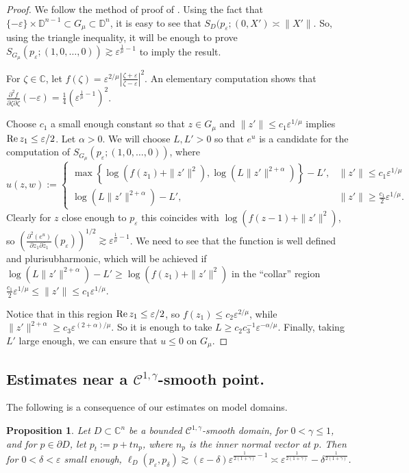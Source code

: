 \documentclass[a4paper,12pt]{amsart}
\def\D{\mathbb D}
\def\C{\mathbb C}
\def\bcases{\begin{cases}}
\newcommand{\br}[1]{\left(#1\right)}
\def\ecases{\end{cases}}
\newcommand{\set}[1]{\left\{ #1\right\}}
\newtheorem{prop}[thm]{Proposition}
\renewcommand{\Re}{\operatorname{\rm{Re}}}
\newcommand{\eps}{\varepsilon}
\begin{document}
\begin{proof}
We follow the method of proof of \cite[Proposition 3]{FL}.
Using the fact that $\{-\eps\}\times \D^{n-1} \subset G_\mu 
\subset \D^n$, it is easy to see that $S_D (p_\eps; (0,X') \asymp \|X'\|$.  So, using the triangle inequality, 
it will be enough to prove $S_{G_\mu}(p_\eps; (1,0,\dots,0)) \gtrsim \eps^{\frac1\mu -1}$ to imply the result.           

For $\zeta\in\C$, let $f(\zeta)= \eps^{2/\mu} \left|\frac{\zeta+\eps}{\zeta-\eps} \right|^2$.
An elementary computation shows that $\frac{\partial^2f}{\partial \zeta \partial \bar \zeta}(-\eps) = \frac14 (\eps^{\frac1\mu -1})^2$. 

Choose $c_1$ a small enough constant so that $z\in G_\mu$ and $\|z'\|\le c_1 \eps^{1/\mu}$
implies $\Re z_1 \le \eps/2$. Let $\alpha>0$. We will choose $L,L'>0$ so that $e^u$ is a candidate for the computation of $S_{G_\mu}(p_\eps; (1,0,\dots,0))$, where
\[
u(z,w):=
\bcases
\max\set{\log\br{f(z_1)+\|z'\|^2}, \log\br{L \|z'\|^{2+\alpha}}}-L',& \|z'\|\le c_1 \eps^{1/\mu}\\
\log\br{L\|z'\|^{2+\alpha}}-L', & \|z'\|\ge \frac{c_1}2 \eps^{1/\mu}.
\ecases
\]
Clearly for $z$ close enough to $p_\eps$ this coincides with $\log\br{f(z-1)+\|z'\|^2}$, 
so $\left( \frac{\partial^2 (e^u)}{\partial z_1 \partial \bar z_1}(p_\eps)\right)^{1/2} \gtrsim \eps^{\frac1\mu -1}$.  We need to see that the function is well defined and plurisubharmonic,
which will be achieved if $\log\br{L\|z'\|^{2+\alpha}}-L'\ge \log\br{f(z_1)+\|z'\|^2}$ in the 
``collar'' region $ \frac{c_1}2 \eps^{1/\mu}\le \|z'\|\le c_1 \eps^{1/\mu}$.

Notice that in this region $\Re z_1 \le \eps/2$, so $f(z_1) \le c_2 \eps^{2/\mu}$,
while $\|z'\|^{2+\alpha}\ge c_3 \eps^{(2+\alpha)/\mu}$. So it is enough to take 
$L\ge c_2 c_3^{-1} \eps^{-\alpha/\mu}$. Finally, taking $L'$ large enough, we can ensure
that $u\le 0$ on $G_\mu$. 
\end{proof}

\subsection{Estimates near a $\mathcal C^{1,\gamma}$-smooth point.}

The following is a consequence of our estimates on model domains. 

\begin{prop}
\label{onegamma}
Let $D \subset \C^n$ be a bounded $\mathcal C^{1,\gamma}$-smooth  domain, for $0<\gamma \le 1$, and
for $p\in \partial D$, let $p_t := p+t n_p$, where $n_p$ is the inner normal vector at $p$. Then for 
$0< \delta < \eps$ small enough, $\ell_D(p_\eps,p_\delta) \gtrsim (\eps-\delta)\eps^{\frac1{2(1+\gamma)}-1}
\asymp \eps^{\frac1{2(1+\gamma)}} - \delta^{\frac1{2(1+\gamma)}}$.
\end{prop}
\end{document}
